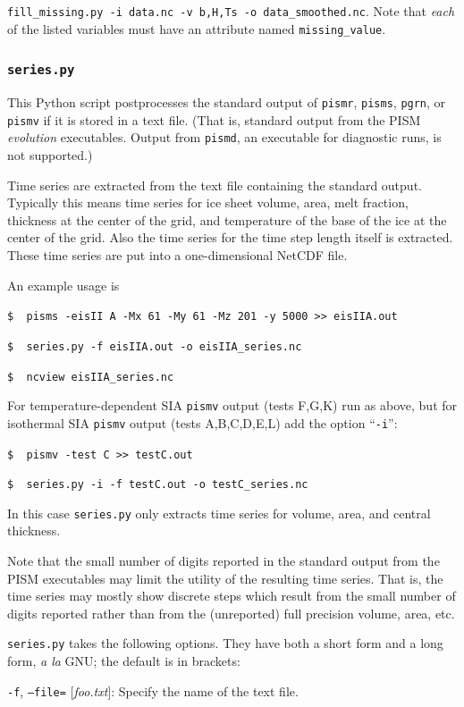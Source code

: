 \documentclass[11pt,final]{amsart}
\newcommand{\optoptdef}[3]{\vspace{1mm}\noindent \large\texttt{-#1},\,\,\texttt{--#2=}\normalsize\,\,[\textsl{#3}]:\quad}
\begin{document}
\verb|fill_missing.py -i data.nc -v b,H,Ts -o data_smoothed.nc|.  Note that \emph{each} of the listed variables must have an attribute named \verb|missing_value|.


\subsubsection*{\Large{\texttt{series.py}}}  This Python script postprocesses the standard output of \verb|pismr|, \verb|pisms|, \verb|pgrn|, or \verb|pismv| if it is stored in a text file.  (That is, standard output from the PISM \emph{evolution} executables.  Output from \verb|pismd|, an executable for diagnostic runs, is not supported.)

Time series are extracted from the text file containing the standard output.  Typically this means time series for ice sheet volume, area, melt fraction, thickness at the center of the grid, and temperature of the base of the ice at the center of the grid.  Also the time series for the time step length itself is extracted.  These time series are put into a one-dimensional NetCDF file.

An example usage is

\verb|$  pisms -eisII A -Mx 61 -My 61 -Mz 201 -y 5000 >> eisIIA.out|

\verb|$  series.py -f eisIIA.out -o eisIIA_series.nc|

\verb|$  ncview eisIIA_series.nc|

For temperature-dependent SIA \verb|pismv| output (tests F,G,K) run as above, but for isothermal SIA \verb|pismv| output (tests A,B,C,D,E,L) add the option ``\verb|-i|'':

\verb|$  pismv -test C >> testC.out|

\verb|$  series.py -i -f testC.out -o testC_series.nc|

\noindent In this case \verb|series.py| only extracts time series for volume, area, and central thickness.

Note that the small number of digits reported in the standard output from the PISM executables may limit the utility of the resulting time series.  That is, the time series may mostly show discrete steps which result from the small number of digits reported rather than from the (unreported) full precision volume, area, etc.

\verb|series.py| takes the following options.  They have both a short form and a long form, \emph{a la} GNU; the default is in brackets:

\optoptdef{f}{file}{foo.txt} Specify the name of the text file.
\end{document}
